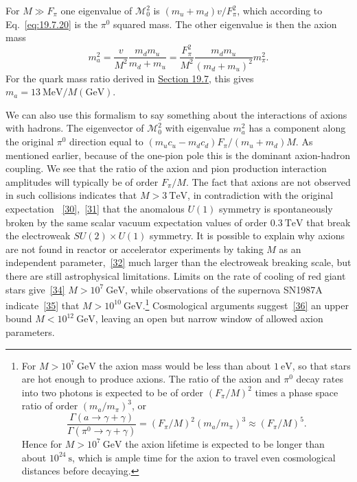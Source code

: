 For $M\gg F_\pi$ one eigenvalue of $\mathcal M_0^2$ is
$(m_u+m_d)v/F_\pi^2$, which according to Eq.~\eqref{eq:19.7.20} is the
$\pi^0$ squared mass. The other eigenvalue is then the axion mass
\begin{equation}
m_a^2=\frac{v}{M^2}\frac{m_dm_u}{m_d+m_u}
=\frac{F_\pi^2}{M^2}\frac{m_dm_u}{(m_d+m_u)^2}m_\pi^2.
\tag{23.6.26}\label{eq:23.6.26}
\end{equation}
For the quark mass ratio derived in \hyperref[sec:19.7]{Section 19.7},
this gives $m_a=13\ \mathrm{MeV}/M(\mathrm{GeV})$.

We can also use this formalism to say something about the interactions
of axions with hadrons. The eigenvector of $\mathcal M_0^2$ with
eigenvalue $m_a^2$ has a component along the original $\pi^0$ direction
equal to $(m_uc_u-m_dc_d)F_\pi/(m_u+m_d)M$. As mentioned earlier,
because of the one-pion pole this is the dominant axion-hadron coupling.
We see that the ratio of the axion and pion production interaction
amplitudes will typically be of order $F_\pi/M$. The fact that axions
are not observed in such collisions indicates that $M>3\ \mathrm{TeV}$,
in contradiction with the original expectation
~\hyperref[ch23-ref-30]{[30]},~\hyperref[ch23-ref-31]{[31]} that the
anomalous $U(1)$ symmetry is spontaneously broken by the same scalar
vacuum expectation values of order $0.3\ \mathrm{TeV}$ that break the
electroweak $SU(2)\times U(1)$ symmetry. It is possible to explain why
axions are not found in reactor or accelerator experiments by taking $M$
as an independent parameter,~\hyperref[ch23-ref-32]{[32]} much larger
than the electroweak breaking scale, but there are still astrophysical
limitations. Limits on the rate of cooling of red giant stars
give~\hyperref[ch23-ref-34]{[34]} $M>10^7\ \mathrm{GeV}$, while
observations of the supernova SN1987A
indicate~\hyperref[ch23-ref-35]{[35]} that
$M>10^{10}\ \mathrm{GeV}$.\footnote{For $M>10^7\ \mathrm{GeV}$ the
axion mass would be less than about $1\ \mathrm{eV}$, so that stars are
hot enough to produce axions. The ratio of the axion and $\pi^0$ decay
rates into two photons is expected to be of order $(F_\pi/M)^2$ times a
phase space ratio of order $(m_a/m_\pi)^3$, or
\[
\frac{\Gamma(a\to\gamma+\gamma)}
{\Gamma(\pi^0\to\gamma+\gamma)}
=(F_\pi/M)^2(m_a/m_\pi)^3\approx(F_\pi/M)^5.
\]
Hence for $M>10^7\ \mathrm{GeV}$ the axion lifetime is expected to be
longer than about $10^{24}\ \mathrm{s}$, which is ample time for the
axion to travel even cosmological distances before decaying.}
Cosmological arguments suggest~\hyperref[ch23-ref-36]{[36]} an upper
bound $M<10^{12}\ \mathrm{GeV}$, leaving an open but narrow window of
allowed axion parameters.
